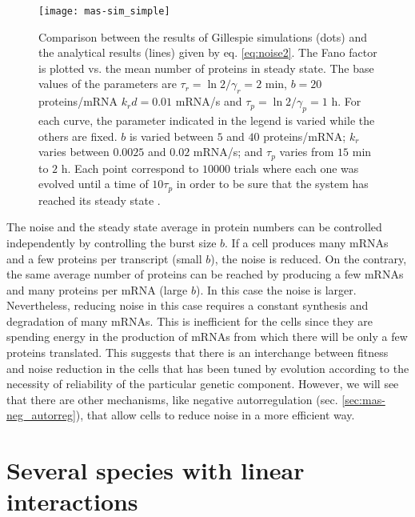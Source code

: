 \begin{figure}[H]
  \centering
  \texttt{[image: mas-sim\_simple]}
  \caption[Noise in proteins: comparing analytical results and Gillespie simulations]{\label{fig:mas-sim_simple} Comparison between the results of Gillespie simulations (dots) and the analytical results (lines) given by eq. \eqref{eq:noise2}. The Fano factor is plotted vs. the mean number of proteins in steady state. The base values of the parameters are $\tau_r = \ln2/\gamma_r = 2$ min,  $b=20$ proteins/mRNA $k_rd = 0.01$ mRNA/s and $\tau_p = \ln2/\gamma_p = 1$ h. For each curve, the parameter indicated in the legend is varied while the others are fixed. $b$ is varied between $5$ and $40$ proteins/mRNA; $k_r$ varies between $0.0025$ and $0.02$ mRNA/s; and $\tau_p$ varies from $15$ min to $2$ h. Each point correspond to $10000$ trials where each one was evolved until a time of $10\tau_p$ in order to be sure that the system has reached its steady state \footnotemark.}
\end{figure}


The noise and the steady state average in protein numbers can be controlled independently by controlling the burst size $b$. If a cell produces many mRNAs and a few proteins per transcript (small $b$), the noise is reduced. On the contrary, the same average number of proteins can be reached by producing a few mRNAs and many proteins per mRNA (large $b$). In this case the noise is larger. Nevertheless, reducing noise in this case requires a constant synthesis and degradation of many mRNAs. This is inefficient for the cells since they are spending energy in the production of mRNAs from which there will be only a few proteins translated. This suggests that there is an interchange between fitness and noise reduction in the cells that has been tuned by evolution according to the necessity of reliability of the particular genetic component. However, we will see that there are other mechanisms, like negative autorregulation (sec. \ref{sec:mas-neg_autorreg}), that allow cells to reduce noise in a more efficient way.

\section{Several species with linear interactions}

